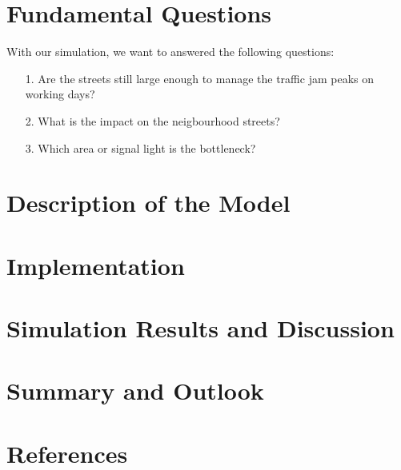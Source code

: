 \documentclass[11pt]{article}
\begin{document}
\section{Fundamental Questions}

With our simulation, we want to answered the following questions:
\begin{itemize}
\item[1.] Are the streets still large enough to manage the traffic jam peaks on working days?
\item[2.] What is the impact on the neigbourhood streets?
\item[3.] Which area or signal light is the bottleneck?
\end{itemize}
\section{Description of the Model}

\section{Implementation}

\section{Simulation Results and Discussion}

\section{Summary and Outlook}

\section{References}
\end{document}
